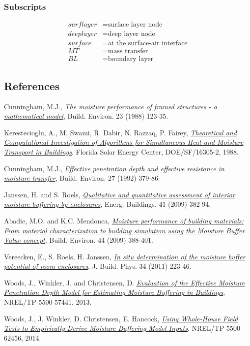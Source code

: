 \subsubsection{Subscripts}\label{subscripts-and-superscripts}
\begin{align*}
	surflayer &= \text{surface layer node} \\
	deeplayer &= \text{deep layer node} \\
	surface &= \text{at the surface-air interface} \\
	MT &= \text{mass transfer} \\
	BL &= \text{boundary layer}
\end{align*}

\subsection{References}\label{references-019}

Cunningham, M.J.,
\href{http://www.sciencedirect.com/science/article/pii/0360132388900261}{\emph{The
		moisture performance of framed structures - a mathematical model}},
Build. Environ. 23 (1988) 123-35.

Kerestecioglu, A., M. Swami, R. Dabir, N. Razzaq, P. Fairey,
\href{http://www.fsec.ucf.edu/en/publications/pdf/FSEC-CR-191-88.pdf}{\emph{Theoretical
		and Computational Investigation of Algorithms for Simultaneous Heat and
		Moisture Transport in Buildings}}. Florida Solar Energy Center,
DOE/SF/16305-2, 1988.

Cunningham, M.J.,
\href{http://www.sciencedirect.com/science/article/pii/036013239290037P}{\emph{Effective
		penetration depth and effective resistance in moisture transfer}},
Build. Environ. 27 (1992) 379-86

Janssen, H. and S. Roels,
\href{http://www.sciencedirect.com/science/article/pii/S0378778808002387}{\emph{Qualitative
		and quantitative assessment of interior moisture buffering by
		enclosures}}, Energ. Buildings. 41 (2009) 382-94.

Abadie, M.O. and K.C. Mendonca,
\href{http://www.sciencedirect.com/science/article/pii/S0360132308000528}{\emph{Moisture
		performance of building materials: From material characterization to
		building simulation using the Moisture Buffer Value concept}}, Build.
Environ. 44 (2009) 388-401.

Vereecken, E., S. Roels, H. Janssen,
\href{http://jen.sagepub.com/content/34/3/223.abstract}{\emph{In situ
		determination of the moisture buffer potential of room enclosures}}, J.
Build. Phys. 34 (2011) 223-46.

Woods, J., Winkler, J, and Christensen, D.
\href{http://www.nrel.gov/docs/fy13osti/57441.pdf}{\emph{Evaluation of
		the Effective Moisture Penetration Depth Model for Estimating Moisture
		Buffering in Buildings}}, NREL/TP-5500-57441, 2013.

Woods, J., J. Winkler, D. Christensen, E. Hancock,
\href{http://www.nrel.gov/docs/fy14osti/62456.pdf}{\emph{Using
		Whole-House Field Tests to Empirically Derive Moisture Buffering Model
		Inputs}}. NREL/TP-5500-62456, 2014.


